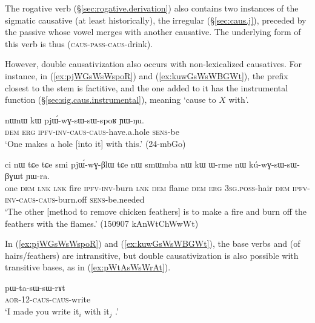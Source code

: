 The rogative verb   (§\ref{sec:rogative.derivation}) also contains two instances of the sigmatic causative (at least historically), the irregular  (§\ref{sec:caus.j}), preceded by the passive  whose vowel merges with another causative. The underlying form of this verb is thus  (\textsc{caus}-\textsc{pass}-\textsc{caus}-drink).

However, double causativization also occurs with non-lexicalized causatives. For instance, in (\ref{ex:pjWGsWsWspoR}) and (\ref{ex:kuwGsWsWBGWt}), the  prefix closest to the stem is factitive, and the one added to it has the instrumental function (§\ref{sec:sig.caus.instrumental}), meaning  `cause to $X$ with'. 

\begin{exe}
\ex \label{ex:pjWGsWsWspoR}
\gll nɯnɯ kɯ pjɯ́-wɣ-sɯ-sɯ-spoʁ ɲɯ-ŋu. \\
\textsc{dem} \textsc{erg} \textsc{ipfv}-\textsc{inv}-\textsc{caus}-\textsc{caus}-have.a.hole \textsc{sens}-be \\
\glt `One makes a hole [into it] with this.' (24-mbGo) 
 \end{exe} 
 
\begin{exe}
\ex \label{ex:kuwGsWsWBGWt}
\gll ci nɯ tɕe tɕe smi pjɯ́-wɣ-βlɯ tɕe nɯ smɯmba nɯ kɯ ɯ-rme nɯ kú-wɣ-sɯ-sɯ-βɣɯt ɲɯ-ra. \\
one \textsc{dem} \textsc{lnk} \textsc{lnk} fire \textsc{ipfv}-\textsc{inv}-burn \textsc{lnk} \textsc{dem} flame \textsc{dem} \textsc{erg} \textsc{3sg}.\textsc{poss}-hair \textsc{dem} \textsc{ipfv}-\textsc{inv}-\textsc{caus}-\textsc{caus}-burn.off \textsc{sens}-be.needed \\
\glt `The other [method to remove chicken feathers] is to make a fire and burn off the feathers with the flames.' (150907 kAnWtChWwWt)
 \end{exe} 
 
 In (\ref{ex:pjWGsWsWspoR}) and (\ref{ex:kuwGsWsWBGWt}), the base verbs  and  (of hairs/feathers) are intransitive, but double causativization is also possible with transitive bases, as in (\ref{ex:pWtAsWsWrAt}).
 
 \begin{exe}
\ex \label{ex:pWtAsWsWrAt}
\gll  pɯ-ta-sɯ-sɯ-rɤt \\
\textsc{aor}-1\fl{}2-\textsc{caus}-\textsc{caus}-write \\
\glt `I made you write it$_i$ with it$_j$ .' 
  \end{exe} 

